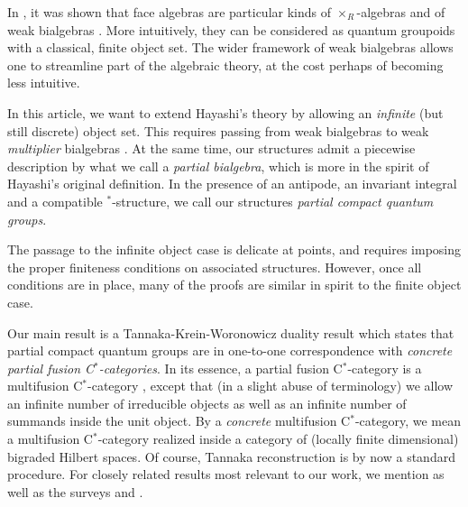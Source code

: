 \documentclass[10pt]{article}
\theoremstyle{definition}
\numberwithin{equation}{section}
\begin{document}
In \cite{Nil1,Sch1,Sch2}, it was shown that face algebras are particular kinds of $\times_R$-algebras \cite{Tak2} and of weak bialgebras \cite{Boh3}. More intuitively, they can be considered as quantum groupoids with a classical, finite object set. The wider framework of weak bialgebras allows one to streamline part of the algebraic theory, at the cost perhaps of becoming less intuitive. 

In this article, we want to extend Hayashi's theory by allowing an \emph{infinite} (but still discrete) object set. This requires passing from weak bialgebras to weak \emph{multiplier} bialgebras \cite{Boh1}. At the same time, our structures admit a piecewise description by what we call a \emph{partial bialgebra}, which is more in the spirit of Hayashi's original definition. In the presence of an antipode, an invariant integral and a compatible $^*$-structure, we call our structures \emph{partial compact quantum groups}. 

The passage to the infinite object case is delicate at points, and requires imposing the proper finiteness conditions on associated structures. However, once all conditions are in place, many of the proofs are similar in spirit to the finite object case. %

Our main result is a Tannaka-Krein-Woronowicz duality result which states that partial compact quantum groups are in one-to-one correspondence with \emph{concrete partial fusion C$^*$-categories}. In its essence, a partial fusion C$^*$-category is a multifusion C$^*$-category \cite{ENO1}, except that (in a slight abuse of terminology) we allow an infinite number of irreducible objects as well as an infinite number of summands inside the unit object. By a \emph{concrete} multifusion C$^*$-category, we mean a multifusion C$^*$-category realized inside a category of (locally finite dimensional) bigraded Hilbert spaces. Of course, Tannaka reconstruction is by now a standard procedure. %
For closely related results most relevant to our work, we mention \cite{Wor2,Sch3,Hay8,Ost1,Hai1,Szl1,Pfe1,DCY1} as well as the surveys \cite{JoS1} and \cite[Section 2.3]{NeT1}.



\end{document}
